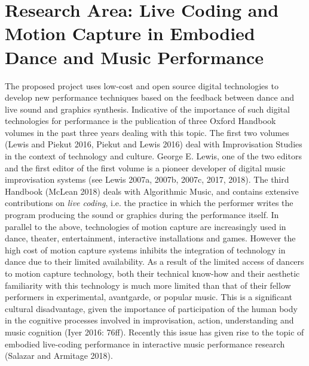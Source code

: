 \section{Research Area: Live Coding and Motion Capture in Embodied Dance and Music Performance}
\label{sec:org38e8242}
The proposed project uses low-cost and open source digital technologies to develop new performance techniques based on the feedback between dance and live sound and graphics synthesis.  Indicative of the importance of such digital technologies for performance is the publication of three Oxford Handbook volumes in the past three years dealing with this topic.  The first two volumes (Lewis and Piekut 2016, Piekut and Lewis 2016) deal with Improvisation Studies in the context of technology and culture.  George E. Lewis, one of the two editors and the first editor of the first volume is a pioneer developer of digital music improvisation systems (see Lewis 2007a, 2007b, 2007c, 2017, 2018).  The third Handbook (McLean 2018) deals with Algorithmic Music, and contains extensive contributions on \emph{live coding}, i.e. the practice in which the performer writes the program producing the sound or graphics during the performance itself.  In parallel to the above, technologies of motion capture are increasingly used in dance, theater, entertainment, interactive installations and games.  However the high cost of motion capture systems inhibits the integration of technology in dance due to their limited availability.  As a result of the limited access of dancers to motion capture technology, both their technical know-how and their aesthetic familiarity with this technology is much more limited than that of their fellow performers in experimental, avantgarde, or popular music.  This is a significant cultural disadvantage, given the importance of participation of the human body in the cognitive processes involved in improvisation, action, understanding and music cognition (Iyer 2016: 76ff).  Recently this issue has given rise to the topic of embodied live-coding performance in interactive music performance research (Salazar and Armitage 2018). 

